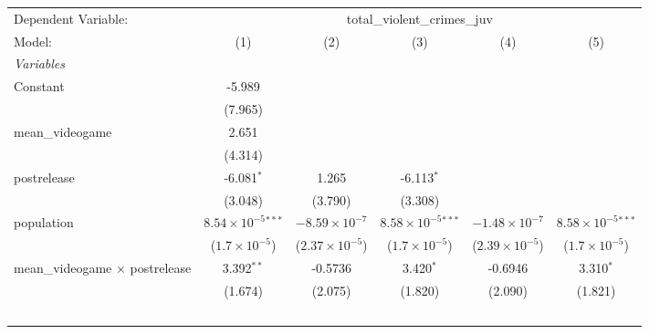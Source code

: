 
\begingroup
\centering
\begin{tabular}{lccccc}
   \tabularnewline \midrule \midrule
   Dependent Variable: & \multicolumn{5}{c}{total\_violent\_crimes\_juv}\\
   Model:                                 & (1)                           & (2)                     & (3)                           & (4)                     & (5)\\  
   \midrule
   \emph{Variables}\\
   Constant                               & -5.989                        &                         &                               &                         &   \\   
                                          & (7.965)                       &                         &                               &                         &   \\   
   mean\_videogame                        & 2.651                         &                         &                               &                         &   \\   
                                          & (4.314)                       &                         &                               &                         &   \\   
   postrelease                            & -6.081$^{*}$                  & 1.265                   & -6.113$^{*}$                  &                         &   \\   
                                          & (3.048)                       & (3.790)                 & (3.308)                       &                         &   \\   
   population                             & $8.54\times 10^{-5}$$^{***}$  & $-8.59\times 10^{-7}$   & $8.58\times 10^{-5}$$^{***}$  & $-1.48\times 10^{-7}$   & $8.58\times 10^{-5}$$^{***}$\\    
                                          & ($1.7\times 10^{-5}$)         & ($2.37\times 10^{-5}$)  & ($1.7\times 10^{-5}$)         & ($2.39\times 10^{-5}$)  & ($1.7\times 10^{-5}$)\\    
   mean\_videogame $\times$ postrelease   & 3.392$^{**}$                  & -0.5736                 & 3.420$^{*}$                   & -0.6946                 & 3.310$^{*}$\\   
                                          & (1.674)                       & (2.075)                 & (1.820)                       & (2.090)                 & (1.821)\\   
$$
\end{tabular}
